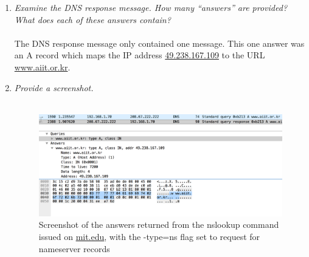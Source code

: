 \documentclass[12pt]{article}
\begin{document}
\begin{enumerate}
	\item{\textit{Examine the DNS response message. How many “answers” are provided? What does each of these answers contain?}}\\ \\
		The DNS response message only contained one message. This one answer was an A record which maps the IP address \url{49.238.167.109} to the URL \url{www.aiit.or.kr}.


	\item{\textit{Provide a screenshot.}}\\ \\
		\begin{figure}[H]
			\centering
			\includegraphics[width=1\textwidth]{23}%
			\caption{Screenshot of the answers returned from the nslookup command issued on \url{mit.edu}, with the -type=ns flag set to request for nameserver records}
		\end{figure}

\end{enumerate}
\end{document}
